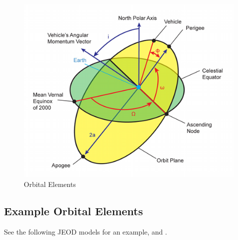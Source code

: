 \begin{figure}[htp]
\centering
\includegraphics [width=7in]{figs/fig8.png}
\caption{Orbital Elements}
\label{fig:8}
\end{figure}

\subsection{Example Orbital Elements}
See the following JEOD models for an example,  and .


